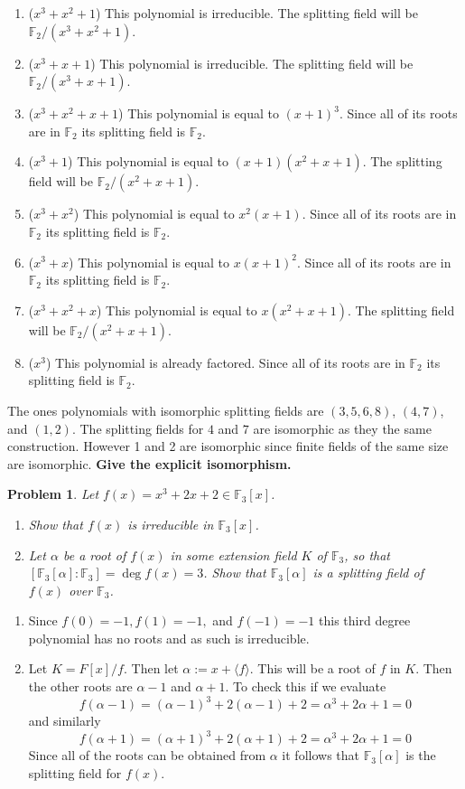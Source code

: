 \documentclass[10pt]{article}
\newcommand{\sk}{\vskip 10mm}
\newcommand{\bb}[1]{\mathbb{#1}}
\theoremstyle{plain}
\newtheorem{problem}{Problem}
\theoremstyle{remark}
\begin{document}
\begin{enumerate}
\item ($x^3+x^2+1$) This polynomial is irreducible. The splitting field will be $\bb{F}_2/(x^3+x^2+1)$.
\item ($x^3+x+1$) This polynomial is irreducible. The splitting field will be $\bb{F}_2/(x^3+x+1)$.
\item ($x^3+x^2+x+1$) This polynomial is equal to $(x+1)^3$. Since all of its roots
  are in $\bb{F}_2$ its splitting field is $\bb{F}_2$.
\item ($x^3+1$) This polynomial is equal to $(x+1)(x^2+x+1)$. The splitting field will be $\bb{F}_2/(x^2+x+1)$.
\item ($x^3+x^2$) This polynomial is equal to $x^2(x+1)$. Since all of its roots
  are in $\bb{F}_2$ its splitting field is $\bb{F}_2$.
\item ($x^3+x$) This polynomial is equal to $x(x+1)^2$. Since all of its roots
  are in $\bb{F}_2$ its splitting field is $\bb{F}_2$.
\item ($x^3+x^2+x$) This polynomial is equal to $x(x^2+x+1)$. The splitting field will be $\bb{F}_2/(x^2+x+1)$.
\item ($x^3$) This polynomial is already factored. Since all of its roots
  are in $\bb{F}_2$ its splitting field is $\bb{F}_2$.
\end{enumerate}

The ones polynomials with isomorphic splitting fields are $(3,5,6,8)$, $(4,7)$, and $(1,2)$.
The splitting fields for $4$ and $7$ are isomorphic as they the same construction.
However 1 and 2 are isomorphic since finite fields of the same size are isomorphic.
\textbf{Give the explicit isomorphism.}

\sk

\begin{problem}
  Let $f(x) = x^3 + 2x + 2 \in \mathbb{F}_3[x]$.
\begin{enumerate}
    \item Show that $f(x)$ is irreducible in $\mathbb{F}_3[x]$.
    \item Let $\alpha$ be a root of $f(x)$ in some extension field $K$
      of $\mathbb{F}_3$, so that
      $[\mathbb{F}_3[\alpha]: \mathbb{F}_3] = \deg f(x) = 3$.
      Show that $\mathbb{F}_3[\alpha]$ is a splitting field of $f(x)$
      over $\mathbb{F}_3$.
\end{enumerate}
\end{problem}

\begin{enumerate}
\item Since $f(0)=-1, f(1)=-1,$ and $f(-1)=-1$ this third degree polynomial has no
  roots and as such is irreducible.
\item Let $K=F[x]/f$. Then let $\alpha:=x+\langle f\rangle$. This will be a root of $f$ in
  $K$. Then the other roots are $\alpha-1$ and $\alpha+1$. To check this if we evaluate
  \[f(\alpha-1)=(\alpha-1)^3+2(\alpha-1)+2=\alpha^3+2\alpha+1=0\]
  and similarly
  \[f(\alpha+1)=(\alpha+1)^3+2(\alpha+1)+2=\alpha^3+2\alpha+1=0 \]
  Since all of the roots can be obtained from $\alpha$ it follows that $\bb{F}_3[\alpha]$
  is the splitting field for $f(x)$.
\end{enumerate}
\end{document}

